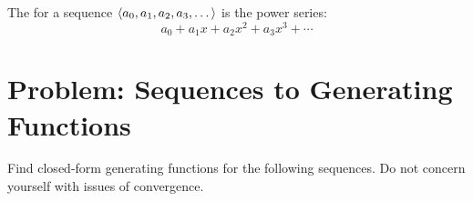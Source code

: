 \documentclass[12pt]{article}
\begin{document}


The  for a sequence $\left\langle a_0, a_1,
a_2, a_3, \dots\right\rangle$ is the power series:
%
\[
a_0 + a_1 x + a_2 x^2 + a_3 x^3 + \cdots
\]


\section{Problem: Sequences to Generating Functions}
Find closed-form generating functions for the following sequences.  Do
not concern yourself with issues of convergence.
\end{document}
